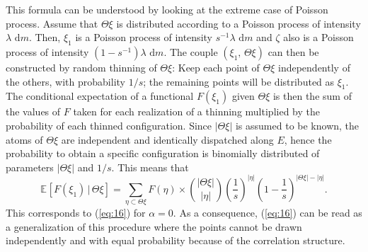 \documentclass[11pt,a4paper]{amsart}
\begin{document}
This formula can be understood by looking at the extreme case of
Poisson process. Assume that $\Theta\xi$ is distributed according to a
Poisson process of intensity $\lambda{\text{ d}} m$. Then, $\xi_1$ is a Poisson
process of intensity $s^{-1}\lambda {\text{ d}} m$ and $\zeta$ also is a
Poisson process of intensity $(1-s^{-1})\lambda {\text{ d}} m$. The couple
$(\xi_1,\, \Theta\xi)$ can then be constructed by random thinning of
$\Theta\xi$: Keep each point of $\Theta\xi$ independently of the
others, with probability $1/s$; the remaining points will be
distributed as $\xi_1$. The conditional expectation of a functional
$F(\xi_1)$ given $\Theta\xi$ is then the sum of the values of $F$
taken for each realization of a thinning multiplied by the probability
of each thinned configuration. Since $|\Theta\xi|$ is assumed to be
known, the atoms of $\Theta\xi$ are independent and identically
dispatched along $E$, hence the probability to obtain a specific
configuration is binomially distributed of parameters $|\Theta\xi|$
and $1/s.$ This means that
\begin{equation*}
  {{\mathbb E}_{{}}\left[{{F(\xi_1)\, |\, \Theta\xi}}\right]}=\sum_{\eta\subset \Theta\xi} F(\eta)\times 
  \binom{|\Theta\xi|}{|\eta|} \left(\frac{1}{s}\right)^{|\eta|}\left(1-\frac 1s\right)^{|\Theta\xi|-|\eta|}.
\end{equation*}
This corresponds to (\ref{eq:16}) for $\alpha=0$.  As a consequence,
(\ref{eq:16}) can be read as a generalization of this procedure where
the points cannot be drawn independently and with equal probability
because of the correlation structure.
\end{document}

